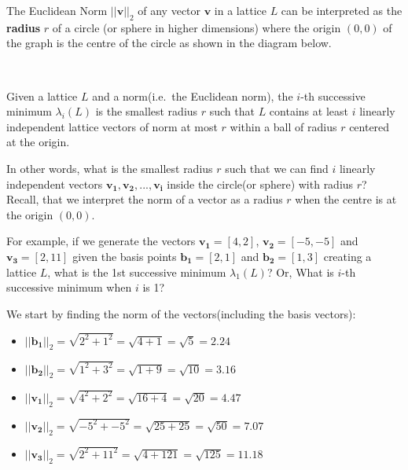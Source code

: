 \documentclass[11pt]{article}
\providecommand{\tightlist}{%
      \setlength{\itemsep}{0pt}\setlength{\parskip}{0pt}}
\begin{document}
    The Euclidean Norm \(||\mathbf{v}||_2\) of any vector \(\mathbf{v}\) in
a lattice \(L\) can be interpreted as the \textbf{radius} \(r\) of a
circle (or sphere in higher dimensions) where the origin \((0, 0)\) of
the graph is the centre of the circle as shown in the diagram below.

    \begin{center}
    \end{center}
    { \hspace*{\fill} \\}
    
    Given a lattice \(L\) and a norm(i.e.~the Euclidean norm), the \(i\)-th
successive minimum \(\lambda_i(L)\) is the smallest radius \(r\) such
that \(L\) contains at least \(i\) linearly independent lattice vectors
of norm at most \(r\) within a ball of radius \(r\) centered at the
origin.

In other words, what is the smallest radius \(r\) such that we can find
\(i\) linearly independent vectors
\(\mathbf{v_1}, \mathbf{v_2}, ..., \mathbf{v_i}\) inside the circle(or
sphere) with radius \(r\)? Recall, that we interpret the norm of a
vector as a radius \(r\) when the centre is at the origin \((0, 0)\).

For example, if we generate the vectors \(\mathbf{v_1} = [4, 2]\),
\(\mathbf{v_2} = [-5, -5]\) and \(\mathbf{v_3} = [2, 11]\) given the
basis points \(\mathbf{b_1} = [2, 1]\) and \(\mathbf{b_2} = [1, 3]\)
creating a lattice \(L\), what is the 1st successive minimum
\(\lambda_1(L)\)? Or, What is \(i\)-th successive minimum when \(i\) is
1?

We start by finding the norm of the vectors(including the basis
vectors):

\begin{itemize}
\tightlist
\item
  \(||\mathbf{b_1}||_2 = \sqrt{2^2 + 1^2} = \sqrt{4 + 1} = \sqrt{5} = 2.24\)
\item
  \(||\mathbf{b_2}||_2 = \sqrt{1^2 + 3^2} = \sqrt{1 + 9} = \sqrt{10} = 3.16\)
\item
  \(||\mathbf{v_1}||_2 = \sqrt{4^2 + 2^2} = \sqrt{16 + 4} = \sqrt{20} = 4.47\)
\item
  \(||\mathbf{v_2}||_2 = \sqrt{-5^2 + -5^2} = \sqrt{25 + 25} = \sqrt{50} = 7.07\)
\item
  \(||\mathbf{v_3}||_2 = \sqrt{2^2 + 11^2} = \sqrt{4 + 121} = \sqrt{125} = 11.18\)
\end{itemize}
\end{document}
